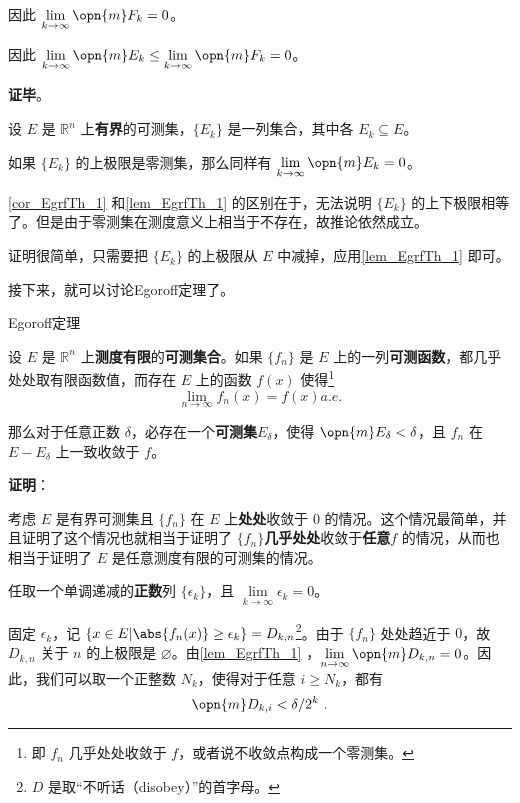 因此 $\lim\limits_{k\to\infty}\opn{m}F_k=0$。

因此 $\lim\limits_{k\to\infty}\opn{m}E_k\leq\lim\limits_{k\to\infty}\opn{m}F_k=0$。


\textbf{证毕}。

\begin{corollary}{}\label{cor_EgrfTh_1}
设 $E$ 是 $\mathbb{R}^n$ 上\textbf{有界}的可测集，$\{E_k\}$ 是一列集合，其中各 $E_k\subseteq E$。

如果 $\{E_k\}$ 的上极限是零测集，那么同样有 $\lim\limits_{k\to\infty}\opn{m}E_k=0$。
\end{corollary}

\autoref{cor_EgrfTh_1} 和\autoref{lem_EgrfTh_1} 的区别在于，无法说明 $\{E_k\}$ 的上下极限相等了。但是由于零测集在测度意义上相当于不存在，故推论依然成立。

证明很简单，只需要把 $\{E_k\}$ 的上极限从 $E$ 中减掉，应用\autoref{lem_EgrfTh_1} 即可。





接下来，就可以讨论Egoroff定理了。


\begin{theorem}{Egoroff定理}\label{the_EgrfTh_1}

设 $E$ 是 $\mathbb{R}^n$ 上\textbf{测度有限}的\textbf{可测集合}。如果 $\{f_n\}$ 是 $E$ 上的一列\textbf{可测函数}，都几乎处处取有限函数值，而存在 $E$ 上的函数 $f(x)$ 使得\footnote{即 $f_n$ 几乎处处收敛于 $f$，或者说不收敛点构成一个零测集。}\begin{equation}
\lim\limits_{n\to\infty}f_n(x)=f(x)a. e. 
\end{equation}

那么对于任意正数 $\delta$，必存在一个\textbf{可测集}$E_\delta$，使得 $\opn{m}E_\delta<\delta$，且 $f_n$ 在 $E-E_\delta$ 上一致收敛于 $f$。

\end{theorem}

\textbf{证明}：

考虑 $E$ 是有界可测集且 $\{f_n\}$ 在 $E$ 上\textbf{处处}收敛于 $0$ 的情况。这个情况最简单，并且证明了这个情况也就相当于证明了 $\{f_n\}$\textbf{几乎处处}收敛于\textbf{任意}$f$ 的情况，从而也相当于证明了 $E$ 是任意测度有限的可测集的情况。



任取一个单调递减的\textbf{正数}列 $\{\epsilon_k\}$，且 $\lim\limits_{k\to\infty}\epsilon_k=0$。

固定 $\epsilon_k$，记 $\{x\in E|\abs{f_n(x)}\geq\epsilon_k\}=D_{k, n}$\footnote{$D$ 是取“不听话（disobey）”的首字母。}。由于 $\{f_n\}$ 处处趋近于 $0$，故 $D_{k, n}$ 关于 $n$ 的上极限是 $\varnothing$。由\autoref{lem_EgrfTh_1} ，$\lim\limits_{n\to\infty}\opn{m}D_{k, n}=0$。因此，我们可以取一个正整数 $N_k$，使得对于任意 $i\geq N_k$，都有
\begin{equation}\label{eq_EgrfTh_2}
\opn{m}D_{k, i}<\delta/2^k~.
\end{equation}

